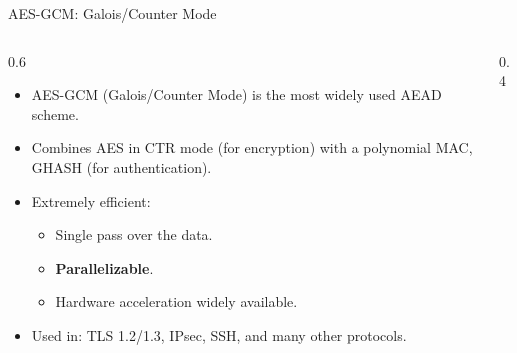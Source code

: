 \ifdefined\PRESENTATION\else\PassOptionsToClass{handout}{beamer}\fi\documentclass[aspectratio=169, lualatex]{beamer}
\begin{document}
\begin{frame}{AES-GCM: Galois/Counter Mode}
	\begin{columns}[c]
		\begin{column}{0.6\textwidth}
			\begin{itemize}[<+->]
				\item AES-GCM (Galois/Counter Mode) is the most widely used AEAD scheme.
				\item Combines AES in CTR mode (for encryption) with a polynomial MAC, GHASH (for authentication).
				\item Extremely efficient:
				      \begin{itemize}
					      \item Single pass over the data.
					      \item \textbf{Parallelizable}.
					      \item Hardware acceleration widely available.
				      \end{itemize}
				\item Used in: TLS 1.2/1.3, IPsec, SSH, and many other protocols.
			\end{itemize}
		\end{column}
		\begin{column}{0.4\textwidth}
			\begin{center}
			\end{center}
		\end{column}
	\end{columns}
\end{frame}
\end{document}
